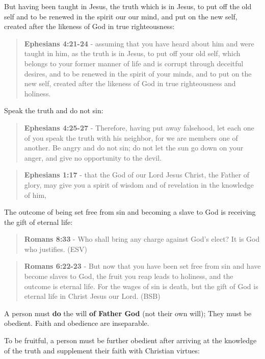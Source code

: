 \documentclass[11pt]{article}
\begin{document}
But having been taught in Jesus, the truth which is in Jesus, to put off the old self and to be renewed in the spirit our our mind, and put on the new self, created after the likeness of God in true righteousness:

\begin{quote}
\textbf{Ephesians 4:21-24} - assuming that you have heard about him and were taught in him, as the truth is in Jesus, to put off your old self, which belongs to your former manner of life and is corrupt through deceitful desires, and to be renewed in the spirit of your minds, and to put on the new self, created after the likeness of God in true righteousness and holiness.
\end{quote}

Speak the truth and do not sin:

\begin{quote}
\textbf{Ephesians 4:25-27} - Therefore, having put away falsehood, let each one of you speak the truth with his neighbor, for we are members one of another. Be angry and do not sin; do not let the sun go down on your anger, and give no opportunity to the devil.
\end{quote}

\begin{quote}
\textbf{Ephesians 1:17} - that the God of our Lord Jesus Christ, the Father of glory, may give you a spirit of wisdom and of revelation in the knowledge of him,
\end{quote}

The outcome of being set free from sin and becoming a slave to God is receiving the gift of eternal life:

\begin{quote}
\textbf{Romans 8:33} -  Who shall bring any charge against God's elect?  It is God who justifies.  (ESV)
\end{quote}

\begin{quote}
\textbf{Romans 6:22-23} - But now that you have been set free from sin and have become slaves to God, the fruit you reap leads to holiness, and the outcome is eternal life. For the wages of sin is death, but the gift of God is eternal life in Christ Jesus our Lord. (BSB)
\end{quote}

A person must \textbf{do} the will \textbf{of Father God} (not their own will); They must be obedient.
Faith and obedience are inseparable.

To be fruitful, a person must be further obedient after arriving at the knowledge of the truth and supplement their faith with Christian virtues:
\end{document}
